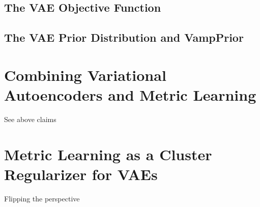 \documentclass[./dissertation.tex]{subfiles}
\begin{document}
    \subsection{The VAE Objective Function}
    \subsection{The VAE Prior Distribution and VampPrior}

    \section{Combining Variational Autoencoders and Metric Learning}
    See above claims
    
    \section{Metric Learning as a Cluster Regularizer for VAEs}
    Flipping the perspective 

    
\end{document}
